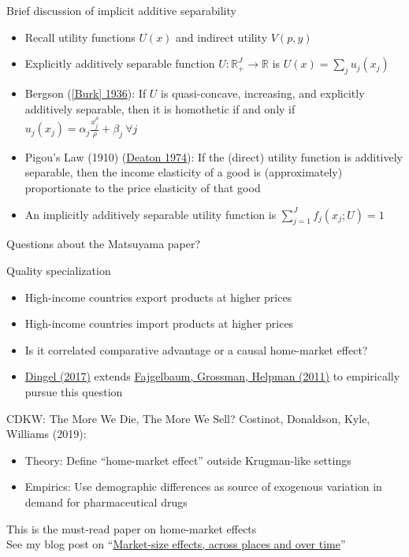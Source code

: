\documentclass[10pt,notes=hide]{beamer}
\begin{document}
\begin{frame}{Brief discussion of implicit additive separability}
\begin{itemize}
	\item Recall utility functions $U(x)$ and indirect utility $V(p,y)$
	\item Explicitly additively separable function $U: \mathbb{R}_{+}^{J} \to \mathbb{R}$ is $U(x) = \sum_j u_j(x_j)$
	\item Bergson (\href{https://www.jstor.org/stable/2967658}{[Burk] 1936}): If $U$ is quasi-concave, increasing, and explicitly additively separable,
	then it is homothetic if and only if
	$u_j(x_j) = \alpha_j \frac{x_j^{\rho}}{\rho} + \beta_j \ \forall j$
	\item Pigou's Law (1910) (\href{https://www.jstor.org/stable/2231258}{Deaton 1974}): If the (direct) utility function is additively separable, then the income elasticity of a good is (approximately) proportionate to the price elasticity of that good
	\item An implicitly additively separable utility function is
	$\sum_{j=1}^{J} f_j\left(x_j; U\right)=1$
\end{itemize}
Questions about the Matsuyama paper?
\end{frame}
\begin{frame}{Quality specialization}
\begin{itemize}
	\item High-income countries export products at higher prices
	\item High-income countries import products at higher prices
	\item Is it correlated comparative advantage or a causal home-market effect?
	\item \href{https://academic.oup.com/restud/article/84/4/1551/2684498}{Dingel (2017)} extends \href{http://www.journals.uchicago.edu/doi/abs/10.1086/662628}{Fajgelbaum, Grossman, Helpman (2011)} to empirically pursue this question
\end{itemize}
\end{frame}
\begin{frame}{CDKW: The More We Die, The More We Sell?}
Costinot, Donaldson, Kyle, Williams (2019):
\begin{itemize}
	\item Theory: Define ``home-market effect'' outside Krugman-like settings
	\item Empirics: Use demographic differences as source of exogenous variation in demand for pharmaceutical drugs
\end{itemize}
This is the must-read paper on home-market effects\\
\vspace{5mm}
\footnotesize{See my blog post on ``\href{https://tradediversion.net/2019/09/23/market-size-effects-across-places-and-over-time/}{Market-size effects, across places and over time}''}
\end{frame}
\end{document}

